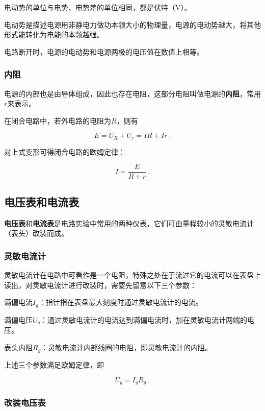 电动势的单位与电势、电势差的单位相同，都是伏特（$\mathrm{V}$）。

电动势是描述电源用非静电力做功本领大小的物理量，电源的电动势越大，将其他形式能转化为电能的本领越强。

电路断开时，电源的电动势和电源两极的电压值在数值上相等。

\subsubsection{内阻}

电源的内部也是由导体组成，因此也存在电阻，这部分电阻叫做电源的\textbf{内阻}，常用$r$来表示。

在闭合电路中，若外电路的电阻为$R$，则有

\begin{equation}
E=U_R+U_r=IR+Ir~.
\end{equation}

对上式变形可得闭合电路的欧姆定律：

\begin{equation}
I=\frac{E}{R+r}~.
\end{equation}

\subsection{电压表和电流表}


\textbf{电压表}和\textbf{电流表}是电路实验中常用的两种仪表，它们可由量程较小的灵敏电流计（表头）改装而成。

\subsubsection{灵敏电流计}

灵敏电流计在电路中可看作是一个电阻，特殊之处在于流过它的电流可以在表盘上读出，对灵敏电流计进行改装时，需要先留意以下三个参数：

满偏电流$I_g$：指针指在表盘最大刻度时通过灵敏电流计的电流。

满偏电压$U_g$：通过灵敏电流计的电流达到满偏电流时，加在灵敏电流计两端的电压。

表头内阻$R_g$：灵敏电流计内部线圈的电阻，即灵敏电流计的内阻。

上述三个参数满足欧姆定律，即

\begin{equation}
U_g=I_g R_g~.
\end{equation}

\subsubsection{改装电压表}

